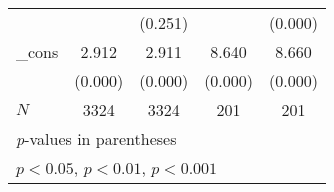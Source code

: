 {\begin{tabular}{l*{4}{c}}
            &                     &     (0.251)         &                     &     (0.000)         \\
[1em]
\_cons      &       2.912\sym{***}&       2.911\sym{***}&       8.640\sym{***}&       8.660\sym{***}\\
            &     (0.000)         &     (0.000)         &     (0.000)         &     (0.000)         \\
\hline
\(N\)       &        3324         &        3324         &         201         &         201         \\
\hline\hline
\multicolumn{5}{l}{\footnotesize \textit{p}-values in parentheses}\\
\multicolumn{5}{l}{\footnotesize \sym{*} \(p<0.05\), \sym{**} \(p<0.01\), \sym{***} \(p<0.001\)}\\
\end{tabular}
}
